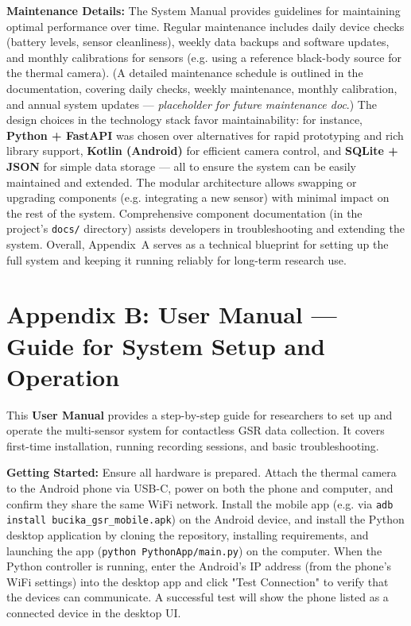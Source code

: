 \textbf{Maintenance Details:} The System Manual provides guidelines for
maintaining optimal performance over time. Regular maintenance includes
daily device checks (battery levels, sensor cleanliness), weekly data
backups and software updates, and monthly calibrations for sensors (e.g.
using a reference black-body source for the thermal camera). (A detailed
maintenance schedule is outlined in the documentation, covering daily
checks, weekly maintenance, monthly calibration, and annual system
updates --- \textit{placeholder for future maintenance
doc}\cite{ref11}.)
The design choices in the technology stack favor maintainability: for
instance, \textbf{Python + FastAPI} was chosen over alternatives for rapid
prototyping and rich library support, \textbf{Kotlin (Android)} for efficient
camera control, and \textbf{SQLite + JSON} for simple data storage --- all to
ensure the system can be easily maintained and
extended\cite{ref12}.
The modular architecture allows swapping or upgrading components (e.g.
integrating a new sensor) with minimal impact on the rest of the system.
Comprehensive component documentation (in the project's \texttt{docs/}
directory) assists developers in troubleshooting and extending the
system\cite{ref13}.
Overall, Appendix A serves as a technical blueprint for setting up the
full system and keeping it running reliably for long-term research use.

\section{Appendix B: User Manual --- Guide for System Setup and Operation}

This \textbf{User Manual} provides a step-by-step guide for researchers to
set up and operate the multi-sensor system for contactless GSR data
collection. It covers first-time installation, running recording
sessions, and basic troubleshooting.

\textbf{Getting Started:} Ensure all hardware is prepared. Attach the thermal
camera to the Android phone via USB-C, power on both the phone and
computer, and confirm they share the same WiFi
network\cite{ref14}.
Install the mobile app (e.g. via \texttt{adb install bucika_gsr_mobile.apk}) on
the Android device, and install the Python desktop application by
cloning the repository, installing requirements, and launching the app
(\texttt{python PythonApp/main.py}) on the
computer\cite{ref15}.
When the Python controller is running, enter the Android's IP address
(from the phone's WiFi settings) into the desktop app and click "Test
Connection" to verify that the devices can
communicate\cite{ref16}.
A successful test will show the phone listed as a connected device in
the desktop UI.

